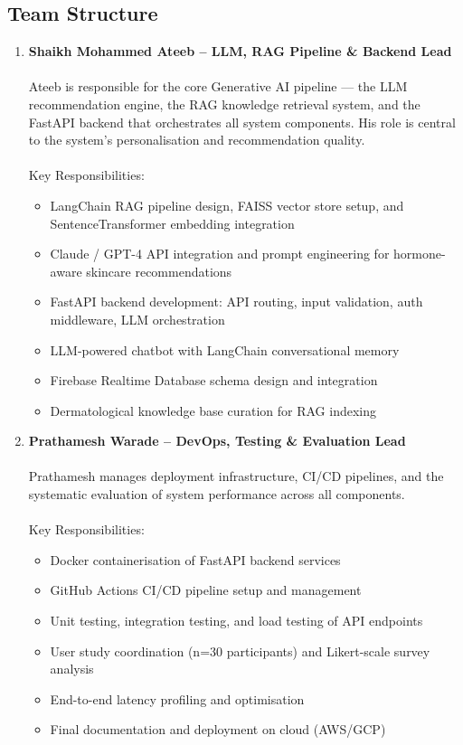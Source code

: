 \subsection{Team Structure}
\begin{enumerate}
    \item \textbf{Shaikh Mohammed Ateeb  -- LLM, RAG Pipeline \& Backend Lead}\\\\
    Ateeb is responsible for the core Generative AI pipeline — the LLM recommendation engine, the RAG knowledge retrieval system, and the FastAPI backend that orchestrates all system components. His role is central to the system's personalisation and recommendation quality.\\\\
    Key Responsibilities:
    \begin{itemize}[label=$\diamond$]
        \item LangChain RAG pipeline design, FAISS vector store setup, and SentenceTransformer embedding integration
        \item Claude / GPT-4 API integration and prompt engineering for hormone-aware skincare recommendations
        \item FastAPI backend development: API routing, input validation, auth middleware, LLM orchestration
        \item LLM-powered chatbot with LangChain conversational memory
        \item Firebase Realtime Database schema design and integration
        \item Dermatological knowledge base curation for RAG indexing
    \end{itemize}
    \vspace{0.5cm}

    \item \textbf{Prathamesh Warade -- DevOps, Testing \& Evaluation Lead}\\\\
    Prathamesh manages deployment infrastructure, CI/CD pipelines, and the systematic evaluation of system performance across all components.\\\\
    Key Responsibilities:
    \begin{itemize}[label=$\diamond$]
        \item Docker containerisation of FastAPI backend services
        \item GitHub Actions CI/CD pipeline setup and management
        \item Unit testing, integration testing, and load testing of API endpoints
        \item User study coordination (n=30 participants) and Likert-scale survey analysis
        \item End-to-end latency profiling and optimisation
        \item Final documentation and deployment on cloud (AWS/GCP)
    \end{itemize}
    \vspace{0.5cm}


\end{enumerate}
